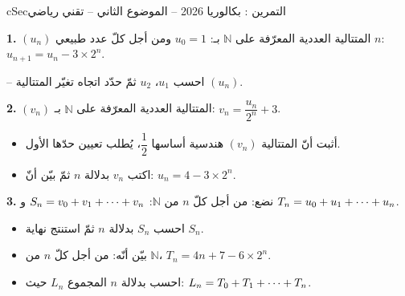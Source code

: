 \documentclass[12pt,a4paper]{article}
\newenvironment{BOX}[2]{\begin{otherlanguage}{english}\begin{arbox}{#1}{#2}}{\end{arbox}\end{otherlanguage}}
\newcounter{exo}
\newenvironment{tamrin}[1]{\stepcounter{exo}\begin{BOX}{cSec}{التمرين \theexo: #1}}{\end{BOX}}
\renewcommand{\cdots}{\mathinner{\cdotp\cdotp\cdotp}}
\newcommand{\N}{\mathbb{N}}
\newenvironment{sq}{\begin{itemize}[leftmargin=2.4em,itemsep=3pt]}{\end{itemize}}
\newcommand{\qa}{\item[(أ)]}\newcommand{\qb}{\item[(ب)]}\newcommand{\qc}{\item[(جـ)]}\newcommand{\qd}{\item[(د)]}\newcommand{\qe}{\item[(هـ)]}
\newcommand{\QQ}[1]{\par\smallskip\textbf{#1.} }
\begin{document}
\begin{tamrin}{بكالوريا 2026 -- الموضوع الثاني -- تقني رياضي}
\QQ{1} $(u_n)$ المتتالية العددية المعرّفة على $\N$ بـ: $u_0=1$ ومن أجل كلّ عدد طبيعي $n$: $u_{n+1}=u_n-3\times2^n$.

-- احسب $u_1$، $u_2$ ثمّ حدّد اتجاه تغيّر المتتالية $(u_n)$.

\QQ{2} $(v_n)$ المتتالية العددية المعرّفة على $\N$ بـ: $v_n=\dfrac{u_n}{2^n}+3$.
\begin{sq}
\qa أثبت أنّ المتتالية $(v_n)$ هندسية أساسها $\dfrac12$، يُطلب تعيين حدّها الأول.
\qb اكتب $v_n$ بدلالة $n$ ثمّ بيّن أنّ: $u_n=4-3\times2^n$.
\end{sq}

\QQ{3} نضع: من أجل كلّ $n$ من $\N$: $S_n=v_0+v_1+\cdots+v_n$ و $T_n=u_0+u_1+\cdots+u_n$.
\begin{sq}
\qa احسب $S_n$ بدلالة $n$ ثمّ استنتج نهاية $S_n$.
\qb بيّن أنّه: من أجل كلّ $n$ من $\N$، $T_n=4n+7-6\times2^n$.
\qc احسب بدلالة $n$ المجموع $L_n$ حيث: $L_n=T_0+T_1+\cdots+T_n$.
\end{sq}
\end{tamrin}
\end{document}
